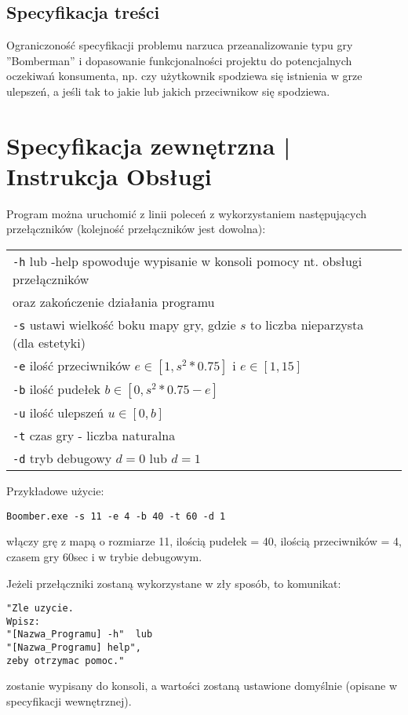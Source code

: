 \documentclass[12pt,a4paper]{article}
\begin{document}
\subsection{Specyfikacja treści}
Ograniczoność specyfikacji problemu narzuca przeanalizowanie typu gry ''Bomberman'' i dopasowanie funkcjonalności projektu do potencjalnych oczekiwań konsumenta, np. czy użytkownik spodziewa się istnienia w grze ulepszeń, a jeśli tak to jakie lub jakich przeciwnikow się spodziewa.
\section{Specyfikacja zewnętrzna | \\ Instrukcja Obsługi}
Program można uruchomić z linii poleceń z wykorzystaniem następujących przełączników (kolejność przełączników jest dowolna):

\begin{tabular}{ll}
\texttt{-h} lub {-help} spowoduje wypisanie w konsoli pomocy nt. obsługi przełączników\\ oraz zakończenie działania programu\\
\texttt{-s} ustawi wielkość boku mapy gry, gdzie $s$ to liczba nieparzysta (dla estetyki)\\
\texttt{-e} ilość przeciwników $e \in [1, s^2 * 0.75]$  i $e \in [1, 15 ]$\\
\texttt{-b} ilość pudełek $b \in [0, s^2 * 0.75 - e]$\\ 
\texttt{-u} ilość ulepszeń $u \in [0, b]$\\ 
\texttt{-t} czas gry - liczba naturalna\\
\texttt{-d} tryb debugowy $d = 0$  lub $d = 1$\\
\end{tabular}

\vspace{5mm} %
Przykładowe użycie:
\begin{verbatim}
Boomber.exe -s 11 -e 4 -b 40 -t 60 -d 1 
\end{verbatim}
włączy grę z mapą o rozmiarze 11, ilością pudełek = 40, ilością przeciwników = 4, czasem gry 60sec i w trybie debugowym.

\vspace{5mm} %
Jeżeli przełączniki zostaną wykorzystane w zły sposób, to komunikat:
\begin{verbatim}
"Zle uzycie. 
Wpisz: 
"[Nazwa_Programu] -h"  lub 
"[Nazwa_Programu] help", 
zeby otrzymac pomoc." 
\end{verbatim}
zostanie wypisany do konsoli, a wartości zostaną ustawione domyślnie (opisane w specyfikacji wewnętrznej).
\end{document}
